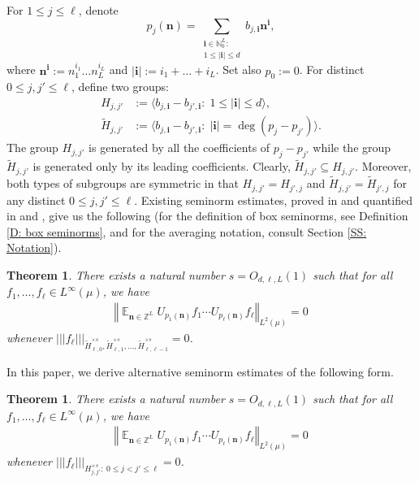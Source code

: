 \documentclass[11pt]{amsart}
\newtheorem{theorem}[lemma]{Theorem}
\theoremstyle{definition}
\DeclareMathOperator*{\E}{\mathbb{E}}
\newcommand{\N}{{\mathbb N}}
\newcommand{\Z}{{\mathbb Z}}
\newcommand{\bn}{{\mathbf{n}}}
\newcommand{\norm}[1]{\left\Vert #1\right\Vert}
\newcommand{\nnorm}[1]{\lvert\!|\!| #1|\!|\!\rvert}
\newcommand{\1}{{\mathbf{1}}}
\newcommand{\bi}{{\textbf{i}}}
\begin{document}
For $1\leq j\leq \ell$, denote $$p_{j}(\bn)=\sum\limits_{\substack{\bi\in\N_0^{L}\colon\\ 1\leq \vert\bi\vert\leq d}} b_{j,\bi}\bn^\bi,$$
where $\bn^{\bi}:=n_{1}^{i_{1}}\dots n_{L}^{i_{L}}$ and $\vert\bi\vert:=i_{1}+\dots+i_{L}$. Set also $p_0 := 0$.
For distinct $0\leq j,j'\leq \ell$, %
define two groups:
\begin{align*}%
    H_{j,j'}&:=\langle b_{j,\bi}-b_{j',\bi}\colon\; 1\leq \vert\bi\vert\leq d \rangle,\\
    \tilde H_{j,j'}&:=\langle b_{j,\bi}-b_{j',\bi}\colon\; \vert\bi\vert= \deg (p_j-p_{j'}) \rangle.
\end{align*}
The group $H_{j,j'}$ is generated by all the coefficients of $p_j-p_{j'}$ while the group $\tilde H_{j,j'}$ is generated only by its leading coefficients.
Clearly, $\tilde H_{j,{j'}}\subseteq H_{j,{j'}}$. Moreover, both types of subgroups are symmetric in that $H_{j,{j'}} = H_{j',j}$ and $\tilde H_{j,{j'}} = \tilde H_{j',j}$ for any distinct $0\leq j,{j'}\leq \ell$. Existing seminorm estimates, proved in \cite[Theorem~2.5]{DFKS22} and quantified in \cite[Theorem~1.6]{KKL24a}  and \cite[Proposition~8.6]{DKKST24}, give us the following (for the definition of box seminorms, see Definition \ref{D: box seminorms}, and for the averaging notation, consult Section \ref{SS: Notation}).
\begin{theorem}\label{T: original estimates}
    There exists a natural number $s=O_{d,\ell,L}(1)$ such that for all  $f_1, \ldots, f_\ell\in L^\infty(\mu)$, we have
    \begin{align*}
        \norm{\E_{\bn\in\Z^{L}} U_{p_1(\bn)}f_1\cdots U_{p_\ell(\bn)}f_\ell}_{L^2(\mu)} = 0
    \end{align*}
    whenever $\nnorm{f_\ell}_{\tilde H_{\ell,0}^{\times s}, \tilde H_{\ell,1}^{\times s}, \ldots, \tilde H_{\ell, \ell-1}^{\times s}} = 0$.
\end{theorem}


In this paper, we derive alternative seminorm estimates of the following form.
\begin{theorem}\label{T: new estimates}
    There exists a natural number $s=O_{d,\ell,L}(1)$ such that for all  $f_1, \ldots, f_\ell\in L^\infty(\mu)$, we have
    \begin{align*}
        \norm{\E_{\bn\in\Z^{L}} U_{p_1(\bn)}f_1\cdots U_{p_\ell(\bn)}f_\ell}_{L^2(\mu)} = 0
    \end{align*}
    whenever $\nnorm{f_\ell}_{H_{j,{j'}}^{\times s}\colon\; 0\leq j<{j'}\leq \ell} = 0$.
\end{theorem}
\end{document}

